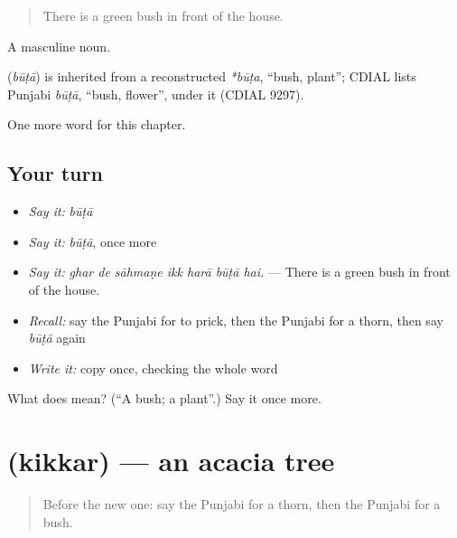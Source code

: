 \begin{quote}
There is a green bush in front of the house.
\end{quote}

A masculine noun.

\begin{cousinweb}
\textbf{} (\emph{būṭā}) is inherited from a reconstructed \emph{*būṭa}, \textquotedblleft{}bush, plant\textquotedblright{}; CDIAL lists Punjabi \emph{būṭā}, \textquotedblleft{}bush, flower\textquotedblright{}, under it (CDIAL 9297).
\end{cousinweb}

\begin{grammarlens}[title={What you've built}]
One more word for this chapter.
\end{grammarlens}

\subsection*{Your turn}
\begin{itemize}
\raggedright
  \item \emph{Say it:} \emph{būṭā}
  \item \emph{Say it:} \emph{būṭā}, once more
  \item \emph{Say it:} \emph{ghar de sāhmaṇe ikk harā būṭā hai.} — There is a green bush in front of the house.
  \item \emph{Recall:} say the Punjabi for to prick, then the Punjabi for a thorn, then say \emph{būṭā} again
  \item \emph{Write it:} copy \textbf{} once, checking the whole word
\end{itemize}

\begin{tcolorbox}[breakable,colback=teal!4,colframe=teal!35!black,title={Before you move on}]
What does  mean? (\textquotedblleft{}A bush; a plant\textquotedblright{}.) Say it once more.
\end{tcolorbox}
\section[\texorpdfstring{\pa{ਕਿੱਕਰ} (kikkar)}{ਕਿੱਕਰ (kikkar)}]{ (kikkar) — an acacia tree}

\label{lesson:PA-C298-kikkar}



\begin{quote}
Before the new one: say the Punjabi for a thorn, then the Punjabi for a bush.
\end{quote}

